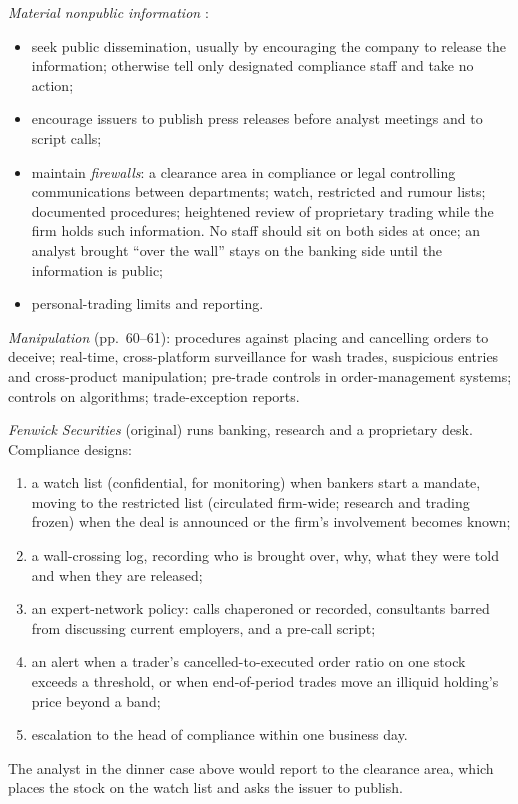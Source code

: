\begin{qfmethod}\label{meth:preventing-market-integrity-violations}
 \emph{Material nonpublic information} \citep[pp.~52--54]{standards-practice-handbook-2024}:
\begin{itemize}
\item seek public dissemination, usually by encouraging the company to release the information; otherwise tell only designated compliance staff and take no action;
\item encourage issuers to publish press releases before analyst meetings and to script calls;
\item maintain \emph{firewalls}: a clearance area in compliance or legal controlling communications between departments; watch, restricted and rumour lists; documented procedures; heightened review of proprietary trading while the firm holds such information. No staff should sit on both sides at once; an analyst brought ``over the wall'' stays on the banking side until the information is public;
\item personal-trading limits and reporting.
\end{itemize}
\emph{Manipulation} (pp.~60--61): procedures against placing and cancelling orders to deceive; real-time, cross-platform surveillance for wash trades, suspicious entries and cross-product manipulation; pre-trade controls in order-management systems; controls on algorithms; trade-exception reports.

 \emph{Fenwick Securities} (original) runs banking, research and a proprietary desk. Compliance designs:
\begin{enumerate}
\item a watch list (confidential, for monitoring) when bankers start a mandate, moving to the restricted list (circulated firm-wide; research and trading frozen) when the deal is announced or the firm's involvement becomes known;
\item a wall-crossing log, recording who is brought over, why, what they were told and when they are released;
\item an expert-network policy: calls chaperoned or recorded, consultants barred from discussing current employers, and a pre-call script;
\item an alert when a trader's cancelled-to-executed order ratio on one stock exceeds a threshold, or when end-of-period trades move an illiquid holding's price beyond a band;
\item escalation to the head of compliance within one business day.
\end{enumerate}
The analyst in the dinner case above would report to the clearance area, which places the stock on the watch list and asks the issuer to publish.


\end{qfmethod}
